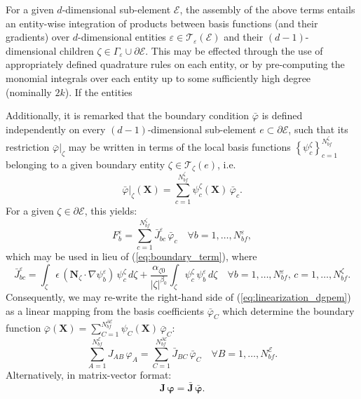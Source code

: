 	For a given $d$-dimensional sub-element $\mathcal{E}$, the assembly of the above terms entails an entity-wise integration of products between basis functions (and their gradients) over $d$-dimensional entities $\varepsilon \in \mathcal{T}_\varepsilon (\mathcal{E})$ and their $(d-1)$-dimensional children $\zeta \in \Gamma_\varepsilon \cup \partial \mathcal{E}$. This may be effected through the use of appropriately defined quadrature rules on each entity, or by pre-computing the monomial integrals over each entity up to some sufficiently high degree (nominally $2k$). If the entities
	
	Additionally, it is remarked that the boundary condition $\bar{\varphi}$ is defined independently on every $(d-1)$-dimensional sub-element $e \subset \partial \mathcal{E}$, such that its restriction $\bar{\varphi}|_\zeta$ may be written in terms of the local basis functions $\left\{ \psi^{\zeta}_c \right\}_{c=1}^{N^\zeta_{bf}}$ belonging to a given boundary entity $\zeta \in \mathcal{T}_{\zeta} (e)$, i.e.
	\begin{equation}
			\bar{\varphi}|_\zeta (\mathbf{X}) = \sum_{c=1}^{N^\zeta_{bf}} \psi^\zeta_c (\mathbf{X}) \, \bar{\varphi}_c.
	\end{equation}
	For a given $\zeta \in \partial \mathcal{E}$, this yields:
	\begin{equation}
		F^{\varepsilon}_b = \sum_{c=1}^{N^\zeta_{bf}} \bar{J}^{\varepsilon}_{bc} \, \bar{\varphi}_c \quad \forall b = 1, \ldots, N^{\varepsilon}_{bf},
	\end{equation}
	which may be used in lieu of (\ref{eq:boundary_term}), where
	\begin{equation}
		\bar{J}^{\varepsilon}_{bc} = \int_{\zeta} \epsilon \, (\mathbf{N}_{\zeta} \cdot \nabla \psi_b^{\varepsilon}) \, \psi^\zeta_c  \, d \zeta + \frac{\alpha_{\zeta0}}{|\zeta|^{\beta_0}} \int_{\zeta} \psi^\zeta_c \, \psi_b^{\varepsilon} \, d \zeta \quad \forall b = 1, \ldots, N^{\varepsilon}_{bf}, \, c = 1, \ldots, N^\zeta_{bf}.
	\end{equation}
	Consequently, we may re-write the right-hand side of (\ref{eq:linearization_dgpem}) as a linear mapping from the basis coefficients $\bar{\varphi}_C$ which determine the boundary function $\bar{\varphi} (\mathbf{X}) = \sum_{C=1}^{N^{\partial \mathcal{E}}_{bf}} \psi_C (\mathbf{X}) \, \bar{\varphi}_C$:
	\begin{equation}
		\sum_{A=1}^{N^{\mathcal{E}}_{bf}} J_{AB} \, \varphi_A = \sum_{C=1}^{N^{\partial \mathcal{E}}_{bf}} \bar{J}_{BC} \, \bar{\varphi}_C \quad \forall B = 1, \ldots, N^{\mathcal{E}}_{bf}.
	\end{equation}
	Alternatively, in matrix-vector format:
	\begin{equation}
		\mathbf{J} \, \boldsymbol{\varphi} = \bar{\mathbf{J}} \, \bar{\boldsymbol{\varphi}}.
		\label{eq:dgpem_linear_system}
	\end{equation}
	
